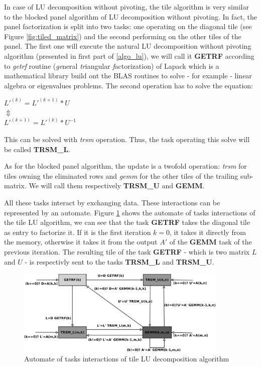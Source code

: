 In case of LU decomposition without pivoting, the tile algorithm is very similar to the blocked panel algorithm of LU decomposition without pivoting. In fact, the panel factorization is split into two tasks: one operating on the diagonal tile (see Figure \ref{fig:tiled_matrix}) and the second performing on the other tiles of the panel. The first one will execute the natural LU decomposition without pivoting algorithm (presented in first part of \ref{algo_lu}), we will call it  \textbf{GETRF} according to \emph{getrf} routine (\emph{ge}neral  \emph{tr}iangular \emph{f}actorization) of Lapack which is a mathematical library build ont the BLAS routines to solve - for example - linear algebra or eigenvalues problems. The second operation has to solve the equation:
\begin{center}
$L'^{(k)} = L'^{(k+1)} * U$\\
$\Updownarrow$\\
$L'^{(k+1)} = L'^{(k)} * U^{-1}$
\end{center}
This can be solved with \emph{trsm} operation. Thus, the task operating this solve will be called \textbf{TRSM\_L}.

As for the blocked panel algorithm, the update is a twofold operation: \emph{trsm} for tiles owning the eliminated rows and \emph{gemm} for the other tiles of the trailing sub-matrix. We will call them respectively \textbf{TRSM\_U} and \textbf{GEMM}.

All these tasks interact by exchanging data. These interactions can be represented by an automate. Figure \ref{fig:automate} shows the automate of tasks interactions of the tile LU algorithm, we can see that the task \textbf{GETRF} takes the diagonal tile as entry to factorize it. If it is the first iteration $k=0$, it takes it directly from the memory, otherwise it takes it from the output $A'$ of the \textbf{GEMM} task of the previous iteration. The resulting tile of the task \textbf{GETRF} - which is two matrix $L$ and $U$ - is respectivly sent to the tasks \textbf{TRSM\_L} and \textbf{TRSM\_U}.

\begin{figure}[!ht]
\centering
\includegraphics[width=0.9\textwidth]{figures/automate.pdf}
\caption{Automate of tasks interactions of tile LU decomposition algorithm \label{fig:automate}}
\end{figure}

